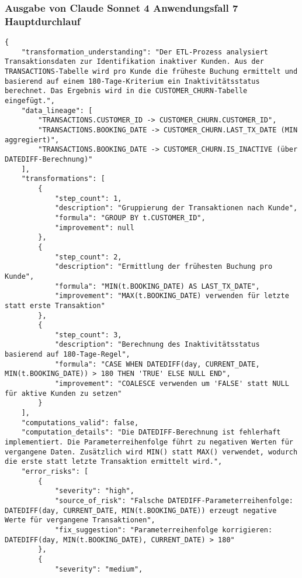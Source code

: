 \subsubsection{Ausgabe von Claude Sonnet 4 Anwendungsfall 7 Hauptdurchlauf}\label{anhang:subsubsec:claude_case7_prompt1}
\begin{lstlisting}[caption={Ausgabe: Claude Sonnet 4 Anwendungsfall 7 Hauptdurchlauf},label={claude_case7_prompt1}]
{
    "transformation_understanding": "Der ETL-Prozess analysiert Transaktionsdaten zur Identifikation inaktiver Kunden. Aus der TRANSACTIONS-Tabelle wird pro Kunde die früheste Buchung ermittelt und basierend auf einem 180-Tage-Kriterium ein Inaktivitätsstatus berechnet. Das Ergebnis wird in die CUSTOMER_CHURN-Tabelle eingefügt.",
    "data_lineage": [
        "TRANSACTIONS.CUSTOMER_ID -> CUSTOMER_CHURN.CUSTOMER_ID",
        "TRANSACTIONS.BOOKING_DATE -> CUSTOMER_CHURN.LAST_TX_DATE (MIN aggregiert)",
        "TRANSACTIONS.BOOKING_DATE -> CUSTOMER_CHURN.IS_INACTIVE (über DATEDIFF-Berechnung)"
    ],
    "transformations": [
        {
            "step_count": 1,
            "description": "Gruppierung der Transaktionen nach Kunde",
            "formula": "GROUP BY t.CUSTOMER_ID",
            "improvement": null
        },
        {
            "step_count": 2,
            "description": "Ermittlung der frühesten Buchung pro Kunde",
            "formula": "MIN(t.BOOKING_DATE) AS LAST_TX_DATE",
            "improvement": "MAX(t.BOOKING_DATE) verwenden für letzte statt erste Transaktion"
        },
        {
            "step_count": 3,
            "description": "Berechnung des Inaktivitätsstatus basierend auf 180-Tage-Regel",
            "formula": "CASE WHEN DATEDIFF(day, CURRENT_DATE, MIN(t.BOOKING_DATE)) > 180 THEN 'TRUE' ELSE NULL END",
            "improvement": "COALESCE verwenden um 'FALSE' statt NULL für aktive Kunden zu setzen"
        }
    ],
    "computations_valid": false,
    "computation_details": "Die DATEDIFF-Berechnung ist fehlerhaft implementiert. Die Parameterreihenfolge führt zu negativen Werten für vergangene Daten. Zusätzlich wird MIN() statt MAX() verwendet, wodurch die erste statt letzte Transaktion ermittelt wird.",
    "error_risks": [
        {
            "severity": "high",
            "source_of_risk": "Falsche DATEDIFF-Parameterreihenfolge: DATEDIFF(day, CURRENT_DATE, MIN(t.BOOKING_DATE)) erzeugt negative Werte für vergangene Transaktionen",
            "fix_suggestion": "Parameterreihenfolge korrigieren: DATEDIFF(day, MIN(t.BOOKING_DATE), CURRENT_DATE) > 180"
        },
        {
            "severity": "medium",

\end{lstlisting}
